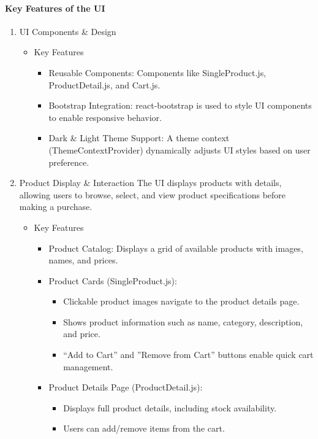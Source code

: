 \documentclass{llncs}
\begin{document}
\paragraph{Key Features of the UI}
\begin{enumerate}
    \item UI Components \& Design
          \begin{itemize}
              \item Key Features
                    \begin{itemize}
                        \item Reusable Components: Components like SingleProduct.js, ProductDetail.js, and Cart.js.
                        \item Bootstrap Integration: react-bootstrap is used to style UI components to enable responsive behavior.
                        \item Dark \& Light Theme Support: A theme context (ThemeContextProvider) dynamically adjusts UI styles based on user preference.
                    \end{itemize}
          \end{itemize}

    \item Product Display \& Interaction
          The UI displays products with details, allowing users to browse, select, and view product specifications before making a purchase.
          \begin{itemize}
              \item Key Features
                    \begin{itemize}
                        \item Product Catalog: Displays a grid of available products with images, names, and prices.
                        \item Product Cards (SingleProduct.js):
                              \begin{itemize}
                                  \item Clickable product images navigate to the product details page.
                                  \item Shows product information such as name, category, description, and price.
                                  \item ``Add to Cart'' and ''Remove from Cart'' buttons enable quick cart management.
                              \end{itemize}
                        \item Product Details Page (ProductDetail.js):
                              \begin{itemize}
                                  \item Displays full product details, including stock availability.
                                  \item Users can add/remove items from the cart.


\end{itemize}
\end{itemize}
\end{itemize}
\end{enumerate}
\end{document}
